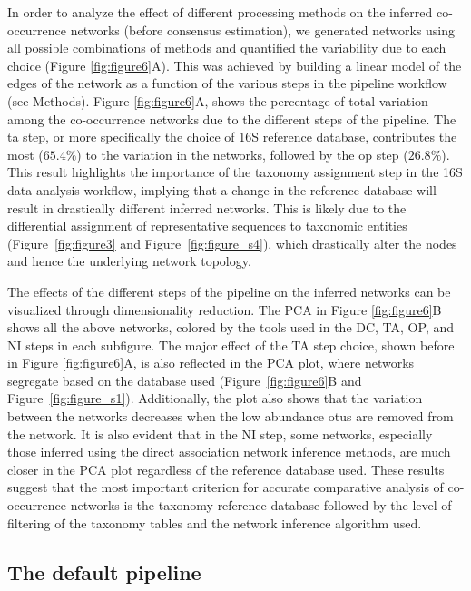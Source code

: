 \documentclass[letterpaper,12pt]{article}
\begin{document}
  In order to analyze the effect of different processing methods on the inferred co-occurrence networks (before consensus estimation), we generated networks using all possible combinations of methods and quantified the variability due to each choice (Figure \ref{fig:figure6}A).
 This was achieved by building a linear model of the edges of the network as a function of the various steps in the pipeline workflow (see Methods).
  Figure \ref{fig:figure6}A, shows the percentage of total variation among the co-occurrence networks due to the different steps of the pipeline.
  The \ac{ta} step, or more specifically the choice of 16S reference database, contributes the most ($65.4\%$) to the variation in the networks, followed by the \ac{op} step ($26.8\%$).
  This result highlights the importance of the taxonomy assignment step in the 16S data analysis workflow, implying that a change in the reference database will result in drastically different inferred networks.
  This is likely due to the differential assignment of representative sequences to taxonomic entities (Figure~\ref{fig:figure3} and Figure~\ref{fig:figure_s4}), which drastically alter the nodes and hence the underlying network topology.

  The effects of the different steps of the pipeline on the inferred networks can be visualized through dimensionality reduction.
  The PCA in Figure \ref{fig:figure6}B shows all the above networks, colored by the tools used in the DC, TA, OP, and NI steps in each subfigure.
  The major effect of the TA step choice, shown before in Figure \ref{fig:figure6}A, is also reflected in the PCA plot, where networks segregate based on the database used (Figure~\ref{fig:figure6}B and Figure~\ref{fig:figure_s1}).
  Additionally, the plot also shows that the variation between the networks decreases when the low abundance \ac{otu}s are removed from the network.
  It is also evident that in the NI step, some networks, especially those inferred using the direct association network inference methods, are much closer in the PCA plot regardless of the reference database used.
  These results suggest that the most important criterion for accurate comparative analysis of co-occurrence networks is the taxonomy reference database followed by the level of filtering of the taxonomy tables and the network inference algorithm used.

  \FloatBarrier

  \subsection*{The default pipeline}
\end{document}
